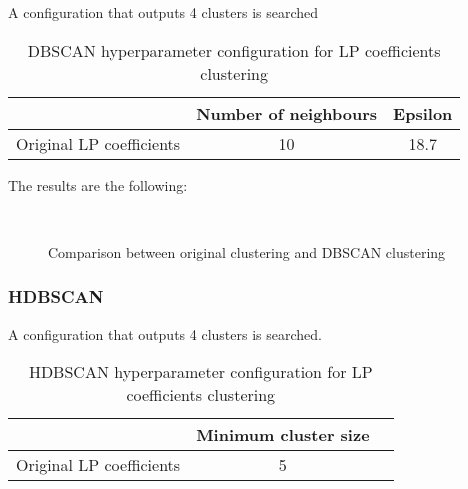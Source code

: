			A configuration that outputs 4 clusters is searched
			
			\begin{table}[h!]
				\centering
				\begin{tabular}{|c|c|c|}
					\hline
					& \textbf{Number of neighbours} & \textbf{Epsilon}\\
					\hline
					Original LP coefficients & 10 & 18.7\\
				\end{tabular}
				\caption{DBSCAN hyperparameter configuration for LP coefficients clustering}
			\end{table}
		
			The results are the following:
			
			\begin{figure*}[ht!]
				\centering
				\hspace{\fill}
				\\
					
				\hspace{\fill}
				\caption{Comparison between original clustering and DBSCAN clustering}
			\end{figure*}
			\FloatBarrier
		
		\subsubsection{HDBSCAN}
			
			A configuration that outputs 4 clusters is searched.
			
			\begin{table}[h!]
				\centering
				\begin{tabular}{|c|c|c|}
					\hline
					& \textbf{Minimum cluster size} \\
					\hline
					Original LP coefficients & 5 \\
				\end{tabular}
				\caption{HDBSCAN hyperparameter configuration for LP coefficients clustering}
			\end{table}
			\FloatBarrier
			
